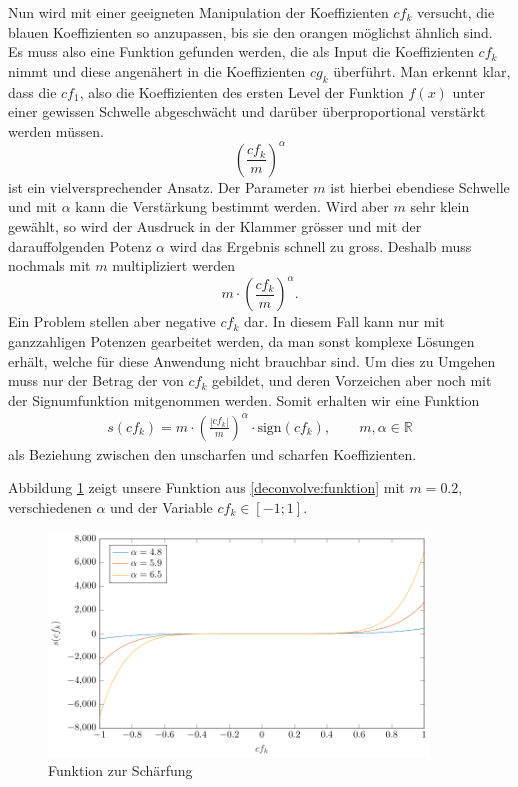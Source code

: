 Nun wird mit einer geeigneten Manipulation der Koeffizienten $cf_k$ versucht, die blauen Koeffizienten so anzupassen, bis sie den orangen möglichst ähnlich sind.
Es muss also eine Funktion gefunden werden, die als Input die Koeffizienten $cf_k$ nimmt und diese angenähert in die Koeffizienten $cg_k$ überführt.
Man erkennt klar, dass die $cf_1$, also die Koeffizienten des ersten Level der Funktion $f(x)$ unter einer gewissen Schwelle abgeschwächt und darüber überproportional verstärkt werden müssen.
$$\left( \frac{cf_k}{m}\right)^\alpha$$
ist ein vielversprechender Ansatz.
Der Parameter $m$ ist hierbei ebendiese Schwelle und mit $\alpha$ kann die Verstärkung bestimmt werden.
Wird aber $m$ sehr klein gewählt, so wird der Ausdruck in der Klammer grösser und mit der darauffolgenden Potenz $\alpha$ wird das Ergebnis schnell zu gross.
Deshalb muss nochmals mit $m$ multipliziert werden
$$m\cdot \left( \frac{cf_k}{m}\right)^\alpha.$$
Ein Problem stellen aber negative $cf_k$ dar. In diesem Fall kann nur mit ganzzahligen Potenzen gearbeitet werden, da man sonst komplexe Lösungen erhält, welche für diese Anwendung nicht brauchbar sind.
Um dies zu Umgehen muss nur der Betrag der von $cf_k$ gebildet, und deren Vorzeichen aber noch mit der Signumfunktion mitgenommen werden.
Somit erhalten wir eine Funktion
\begin{align}
s(cf_k)=m\cdot \left(\frac{|cf_k|}{m}\right)^{\alpha}\cdot \text{sign}(cf_k), \qquad m,\alpha\in\mathbb{R}
\label{deconvolve:funktion}
\end{align}
als Beziehung zwischen den \glqq unscharfen\grqq{} und \glqq scharfen\grqq{} Koeffizienten.

Abbildung \ref{deconvolve:function} zeigt unsere Funktion aus \eqref{deconvolve:funktion} mit $m=0.2$, verschiedenen $\alpha$ und der Variable $cf_k\in[-1;1]$.
\begin{figure}[h]
\centering
\includegraphics[width=0.9\textwidth]{./papers/deconvolve/pictures/function.pdf}
\caption{Funktion zur Schärfung\label{deconvolve:function}}
\end{figure}

